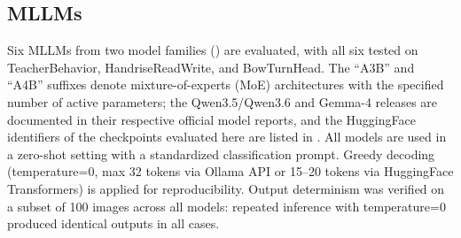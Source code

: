 \documentclass[a4paper,fleqn]{cas-sc}
\begin{document}
\subsection{MLLMs}
\label{sec:mllms}

Six MLLMs from two model families () are evaluated, with all six tested on TeacherBehavior, HandriseReadWrite, and BowTurnHead. The ``A3B'' and ``A4B'' suffixes denote mixture-of-experts (MoE) architectures with the specified number of active parameters; the Qwen3.5/Qwen3.6 and Gemma-4 releases are documented in their respective official model reports, and the HuggingFace identifiers of the checkpoints evaluated here are listed in . All models are used in a zero-shot setting with a standardized classification prompt. Greedy decoding (temperature=0, max 32 tokens via Ollama API or 15--20 tokens via HuggingFace Transformers) is applied for reproducibility. Output determinism was verified on a subset of 100 images across all models: repeated inference with temperature=0 produced identical outputs in all cases.
\end{document}
